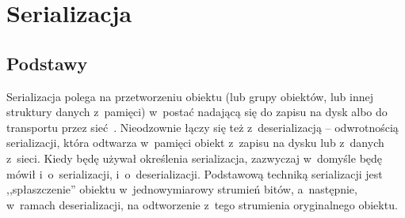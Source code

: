 %
%
%
%
%
%

\section{Serializacja}
\subsection{Podstawy}
Serializacja polega na przetworzeniu obiektu (lub grupy obiektów, lub innej struktury danych z~pamięci) w~postać nadającą się do zapisu na dysk albo do transportu przez sieć~\cite{serialization-basics}. Nieodzownie łączy się też z~deserializacją -- odwrotnością serializacji, która odtwarza w~pamięci obiekt z~zapisu na dysku lub z~danych z~sieci. Kiedy będę używał określenia serializacja, zazwyczaj w~domyśle będę mówił i~o~serializacji, i~o~deserializacji. Podstawową techniką serializacji jest ,,spłaszczenie'' obiektu w~jednowymiarowy strumień bitów, a~następnie, w~ramach deserializacji, na odtworzenie z~tego strumienia oryginalnego obiektu.

